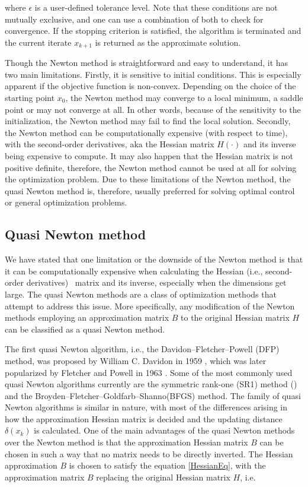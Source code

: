 \documentclass  [
  paper    = a4,
  BCOR     = 10mm,
  twoside,
  fontsize = 12pt,
  fleqn,
  toc      = bibnumbered,
  toc      = listofnumbered,
  numbers  = noendperiod,
  headings = normal,
  listof   = leveldown,
  version  = 3.03
]                                       {scrreprt}
\newcommand{\<}{\langle}
\renewcommand{\>}{\rangle}
\begin{document}
where $\epsilon$ is a user-defined tolerance level. Note that these conditions are not mutually exclusive, and one can use a combination of both to check for convergence. If the stopping criterion is satisfied, the algorithm is terminated and the current iterate $x_{k+1}$ is returned as the approximate solution.

Though the Newton method is straightforward and easy to understand, it has two main limitations. Firstly, it is sensitive to initial conditions. This is especially apparent if the objective function is non-convex. Depending on the choice of the starting point $x_0$, the Newton method may converge to a local minimum, a saddle point or may not converge at all. In other words, because of the sensitivity to the initialization, the Newton method may fail to find the local solution. Secondly, the Newton method can be computationally expensive (with respect to time), with the second-order derivatives, aka the Hessian matrix $H(\cdot)$ and its inverse being expensive to compute. It may also happen that the Hessian matrix is not positive definite, therefore, the Newton method cannot be used at all for solving the optimization problem. Due to these limitations of the Newton method, the quasi Newton method is, therefore, usually preferred for solving optimal control or general optimization problems.


\subsection{Quasi Newton method}
We have stated that one limitation or the downside of the Newton method is that it can be computationally expensive when calculating the Hessian (i.e., second-order derivatives)  matrix and its inverse, especially when the dimensions get large. The quasi Newton methods are a class of optimization methods that attempt to address this issue. More specifically, any modification of the Newton methods employing an approximation matrix $B$ to the original Hessian matrix $H$ can be classified as a quasi Newton method. 

The first quasi Newton algorithm, i.e., the Davidon–Fletcher–Powell (DFP) method, was proposed by William C. Davidon in 1959 \cite{WilDav59}, which was later popularized by Fletcher and Powell in 1963 \cite{FlePow63}. Some of the most commonly used quasi Newton algorithms currently are the symmetric rank-one (SR1) method (\cite{ANP91}) and the Broyden–Fletcher–Goldfarb–Shanno(BFGS) method. The family of quasi Newton algorithms is similar in nature, with most of the differences arising in how the approximation Hessian matrix is decided and the updating distance $\delta(x_k) $ is calculated. One of the main advantages of the quasi Newton methods over the Newton method is that the approximation Hessian matrix $B$ can be chosen in such a way that no matrix needs to be directly inverted. The Hessian approximation $B$ is chosen to satisfy the equation \ref{HessianEq}, with the approximation matrix $B$ replacing the original Hessian matrix $H$, i.e.
\end{document}
